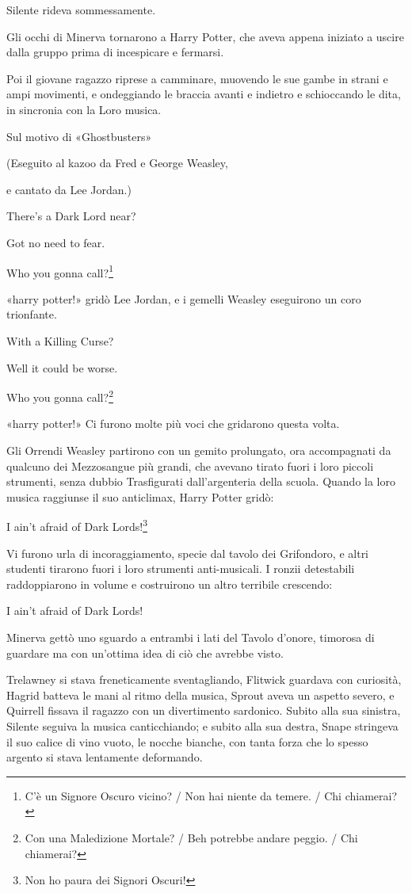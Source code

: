 Silente rideva sommessamente.

Gli occhi di Minerva tornarono a Harry Potter, che aveva appena iniziato a uscire dalla gruppo prima di incespicare e fermarsi.

Poi il giovane ragazzo riprese a camminare, muovendo le sue gambe in strani e ampi movimenti, e ondeggiando le braccia avanti e indietro e schioccando le dita, in sincronia con la Loro musica.

Sul motivo di «Ghostbusters»

(Eseguito al kazoo da Fred e George Weasley,

e cantato da Lee Jordan.)

There’s a Dark Lord near?

Got no need to fear.

Who you gonna call?\footnote{C'è un Signore Oscuro vicino? / Non hai niente da temere. / Chi chiamerai?}

«harry potter!» gridò Lee Jordan, e i gemelli Weasley eseguirono un coro trionfante.

With a Killing Curse?

Well it could be worse.

Who you gonna call?\footnote{Con una Maledizione Mortale? / Beh potrebbe andare peggio. / Chi chiamerai?}

«harry potter!» Ci furono molte più voci che gridarono questa volta.

Gli Orrendi Weasley partirono con un gemito prolungato, ora accompagnati da qualcuno dei Mezzosangue più grandi, che avevano tirato fuori i loro piccoli strumenti, senza dubbio Trasfigurati dall’argenteria della scuola. Quando la loro musica raggiunse il suo anticlimax, Harry Potter gridò:

I ain’t afraid of Dark Lords!\footnote{Non ho paura dei Signori Oscuri!}

Vi furono urla di incoraggiamento, specie dal tavolo dei Grifondoro, e altri studenti tirarono fuori i loro strumenti anti-musicali. I ronzii detestabili raddoppiarono in volume e costruirono un altro terribile crescendo:

I ain’t afraid of Dark Lords!

Minerva gettò uno sguardo a entrambi i lati del Tavolo d’onore, timorosa di guardare ma con un’ottima idea di ciò che avrebbe visto.

Trelawney si stava freneticamente sventagliando, Flitwick guardava con curiosità, Hagrid batteva le mani al ritmo della musica, Sprout aveva un aspetto severo, e Quirrell fissava il ragazzo con un divertimento sardonico. Subito alla sua sinistra, Silente seguiva la musica canticchiando; e subito alla sua destra, Snape stringeva il suo calice di vino vuoto, le nocche bianche, con tanta forza che lo spesso argento si stava lentamente deformando.

